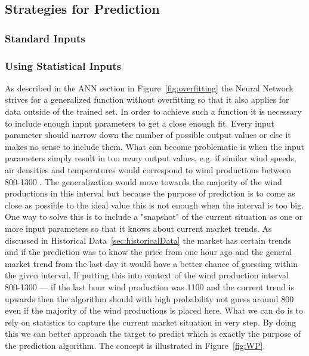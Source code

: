 \subsection{Strategies for Prediction}
\subsubsection{Standard Inputs}

\subsubsection{Using Statistical Inputs}
\label{sec:usingStatisticalInput}
As described in the ANN section  in Figure~\ref{fig:overfitting} the Neural Network strives for a generalized function without overfitting so that it also applies for data outside of the trained set. In order to achieve such a function it is necessary to include enough input parameters to get a close enough fit. Every input parameter should narrow down the number of possible output values or else it makes no sense to include them. What can become problematic is when the input parameters simply result in too many output values, e.g. if similar wind speeds, air densities and temperatures would correspond to wind productions between 800-1300 . The generalization would move towards the majority of the wind productions in this interval but because the purpose of prediction is to come as close as possible to the ideal value this is not enough when the interval is too big. One way to solve this is to include a "snapshot" of the current situation as one or more input parameters so that it knows about current market trends. As discussed in Historical Data~\ref{sec:historicalData} the market has certain trends  and if the prediction was to know the price from one hour ago and the general market trend from the last day it would have a better chance of guessing within the given interval. If putting this into context of the wind production interval 800-1300 --- if the last hour wind production was 1100 and the current trend is upwards then the algorithm should with high probability not guess around 800 even if the majority of the wind productions is placed here. What we can do is to rely on statistics to capture the current market situation in very step. By doing this we can better approach the target to predict which is exactly the purpose of the prediction algorithm. The concept is illustrated in Figure~\ref{fig:WP}.
